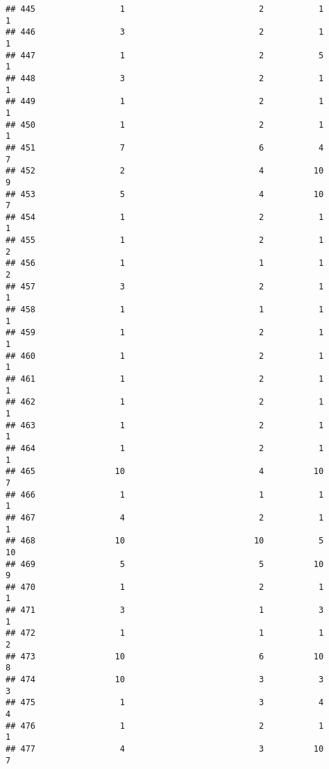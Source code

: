 \documentclass[
]{article}
\begin{document}
\begin{verbatim}
## 445                 1                           2           1               1
## 446                 3                           2           1               1
## 447                 1                           2           5               1
## 448                 3                           2           1               1
## 449                 1                           2           1               1
## 450                 1                           2           1               1
## 451                 7                           6           4               7
## 452                 2                           4          10               9
## 453                 5                           4          10               7
## 454                 1                           2           1               1
## 455                 1                           2           1               2
## 456                 1                           1           1               2
## 457                 3                           2           1               1
## 458                 1                           1           1               1
## 459                 1                           2           1               1
## 460                 1                           2           1               1
## 461                 1                           2           1               1
## 462                 1                           2           1               1
## 463                 1                           2           1               1
## 464                 1                           2           1               1
## 465                10                           4          10               7
## 466                 1                           1           1               1
## 467                 4                           2           1               1
## 468                10                          10           5              10
## 469                 5                           5          10               9
## 470                 1                           2           1               1
## 471                 3                           1           3               1
## 472                 1                           1           1               2
## 473                10                           6          10               8
## 474                10                           3           3               3
## 475                 1                           3           4               4
## 476                 1                           2           1               1
## 477                 4                           3          10               7

\end{verbatim}
\end{document}

